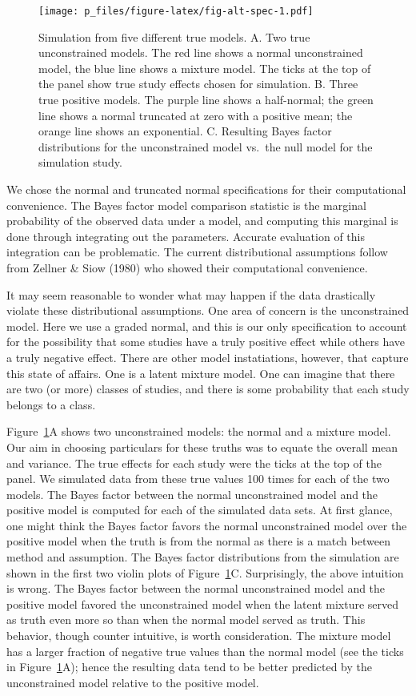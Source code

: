 \documentclass[english,man]{apa6}
\theoremstyle{definition}
\theoremstyle{definition}
\theoremstyle{remark}
\begin{document}
\begin{figure}[htbp]
\centering
\texttt{[image: p\_files/figure-latex/fig-alt-spec-1.pdf]}
\caption{\label{fig:fig-alt-spec}Simulation from five different true models.
A. Two true unconstrained models. The red line shows a normal
unconstrained model, the blue line shows a mixture model. The ticks at
the top of the panel show true study effects chosen for simulation. B.
Three true positive models. The purple line shows a half-normal; the
green line shows a normal truncated at zero with a positive mean; the
orange line shows an exponential. C. Resulting Bayes factor
distributions for the unconstrained model vs.~the null model for the
simulation study.}
\end{figure}

We chose the normal and truncated normal specifications for their
computational convenience. The Bayes factor model comparison statistic
is the marginal probability of the observed data under a model, and
computing this marginal is done through integrating out the parameters.
Accurate evaluation of this integration can be problematic. The current
distributional assumptions follow from Zellner \& Siow (1980) who showed
their computational convenience.

It may seem reasonable to wonder what may happen if the data drastically
violate these distributional assumptions. One area of concern is the
unconstrained model. Here we use a graded normal, and this is our only
specification to account for the possibility that some studies have a
truly positive effect while others have a truly negative effect. There
are other model instatiations, however, that capture this state of
affairs. One is a latent mixture model. One can imagine that there are
two (or more) classes of studies, and there is some probability that
each study belongs to a class.

Figure~\ref{fig:fig-alt-spec}A shows two unconstrained models: the
normal and a mixture model. Our aim in choosing particulars for these
truths was to equate the overall mean and variance. The true effects for
each study were the ticks at the top of the panel. We simulated data
from these true values 100 times for each of the two models. The Bayes
factor between the normal unconstrained model and the positive model is
computed for each of the simulated data sets. At first glance, one might
think the Bayes factor favors the normal unconstrained model over the
positive model when the truth is from the normal as there is a match
between method and assumption. The Bayes factor distributions from the
simulation are shown in the first two violin plots of
Figure~\ref{fig:fig-alt-spec}C. Surprisingly, the above intuition is
wrong. The Bayes factor between the normal unconstrained model and the
positive model favored the unconstrained model when the latent mixture
served as truth even more so than when the normal model served as truth.
This behavior, though counter intuitive, is worth consideration. The
mixture model has a larger fraction of negative true values than the
normal model (see the ticks in Figure~\ref{fig:fig-alt-spec}A); hence
the resulting data tend to be better predicted by the unconstrained
model relative to the positive model.
\end{document}
